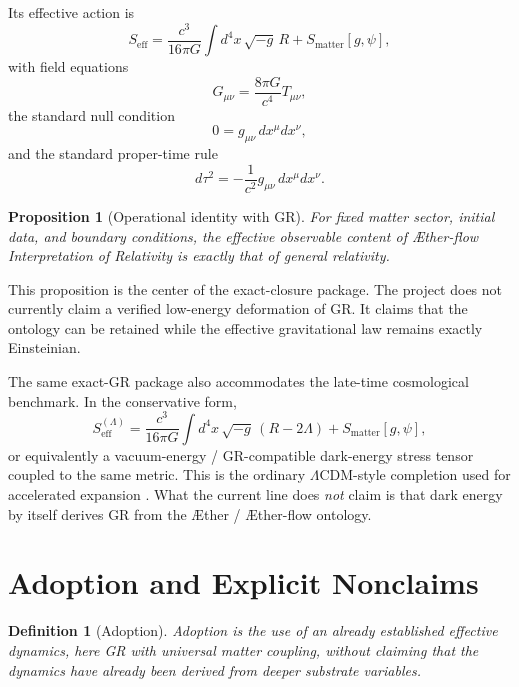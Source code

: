 \documentclass[11pt]{article}
\newcommand{\Aether}{\AE{}ther}
\newcommand{\Aflow}{\AE{}ther-flow}
\newcommand{\TheoryName}{\Aflow{} Interpretation of Relativity}
\newtheorem{definition}{Definition}
\newtheorem{proposition}{Proposition}
\begin{document}
Its effective action is
\begin{equation}
S_{\mathrm{eff}}
=
\frac{c^3}{16\pi G}\int d^4x\,\sqrt{-g}\,R
+
S_{\mathrm{matter}}[g,\psi],
\label{eq:Seff}
\end{equation}
with field equations
\begin{equation}
G_{\mu\nu}
=
\frac{8\pi G}{c^4}T_{\mu\nu},
\label{eq:Einstein}
\end{equation}
the standard null condition
\begin{equation}
0=g_{\mu\nu}\,dx^\mu dx^\nu,
\label{eq:null}
\end{equation}
and the standard proper-time rule
\begin{equation}
d\tau^2=-\frac{1}{c^2}g_{\mu\nu}\,dx^\mu dx^\nu.
\label{eq:tau}
\end{equation}

\begin{proposition}[Operational identity with GR]
For fixed matter sector, initial data, and boundary conditions, the effective observable content of \TheoryName{} is exactly that of general relativity.
\end{proposition}

This proposition is the center of the exact-closure package. The project does not currently claim a verified low-energy deformation of GR. It claims that the ontology can be retained while the effective gravitational law remains exactly Einsteinian.

The same exact-GR package also accommodates the late-time cosmological benchmark. In the conservative form,
\begin{equation}
S_{\mathrm{eff}}^{(\Lambda)}
=
\frac{c^3}{16\pi G}\int d^4x\,\sqrt{-g}\,\left(R-2\Lambda\right)
+
S_{\mathrm{matter}}[g,\psi],
\label{eq:SeffLambda}
\end{equation}
or equivalently a vacuum-energy / GR-compatible dark-energy stress tensor coupled to the same metric. This is the ordinary \(\Lambda\)CDM-style completion used for accelerated expansion \cite{Riess1998,Perlmutter1999,Planck2018Parameters}. What the current line does \emph{not} claim is that dark energy by itself derives GR from the \Aether{} / \Aflow{} ontology.

\section{Adoption and Explicit Nonclaims}

\begin{definition}[Adoption]
Adoption is the use of an already established effective dynamics, here GR with universal matter coupling, without claiming that the dynamics have already been derived from deeper substrate variables.
\end{definition}
\end{document}
